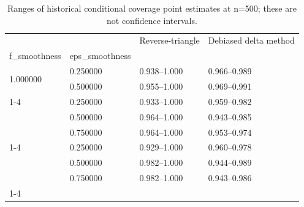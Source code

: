\begin{table}
\caption{Ranges of historical conditional coverage point estimates at n=500; these are not confidence intervals.}
\label{tab:experiment_details_additional_coverage_summary_N500}
\begin{tabular}{llll}
\toprule
 &  & Reverse-triangle & Debiased delta method \\
f_smoothness & eps_smoothness &  &  \\
\midrule
\multirow[t]{2}{*}{1.000000} & 0.250000 & 0.938--1.000 & 0.966--0.989 \\
 & 0.500000 & 0.955--1.000 & 0.969--0.991 \\
\cline{1-4}
\multirow[t]{3}{*}{1.500000} & 0.250000 & 0.933--1.000 & 0.959--0.982 \\
 & 0.500000 & 0.964--1.000 & 0.943--0.985 \\
 & 0.750000 & 0.964--1.000 & 0.953--0.974 \\
\cline{1-4}
\multirow[t]{3}{*}{2.000000} & 0.250000 & 0.929--1.000 & 0.960--0.978 \\
 & 0.500000 & 0.982--1.000 & 0.944--0.989 \\
 & 0.750000 & 0.982--1.000 & 0.943--0.986 \\
\cline{1-4}
\bottomrule
\end{tabular}
\end{table}
